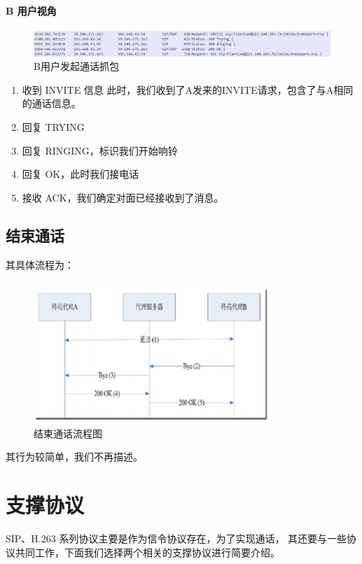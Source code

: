 \documentclass[lang=cn]{elegantpaper}
\begin{document}
\paragraph{B 用户视角}
\begin{figure}[H]
    \centering
    \includegraphics[width=\textwidth]{14}
    \caption{B用户发起通话抓包}
    \label{fig:newB}
\end{figure}
\begin{enumerate}
    \item 收到 INVITE 信息
          此时，我们收到了A发来的INVITE请求，包含了与A相同的通话信息。
    \item 回复 TRYING
    \item 回复 RINGING，标识我们开始响铃
    \item 回复 OK，此时我们接电话
    \item 接收 ACK，我们确定对面已经接收到了消息。
\end{enumerate}

\subsection{结束通话}
其具体流程为：
\begin{figure}[H]
    \centering
    \includegraphics[width=0.8\textwidth]{15}
    \caption{结束通话流程图}
    \label{fig:end}
\end{figure}
其行为较简单，我们不再描述。

\section{支撑协议}

SIP、H.263 系列协议主要是作为信令协议存在，为了实现通话， 其还要与一些协议共同工作，下面我们选择两个相关的支撑协议进行简要介绍。
\end{document}
